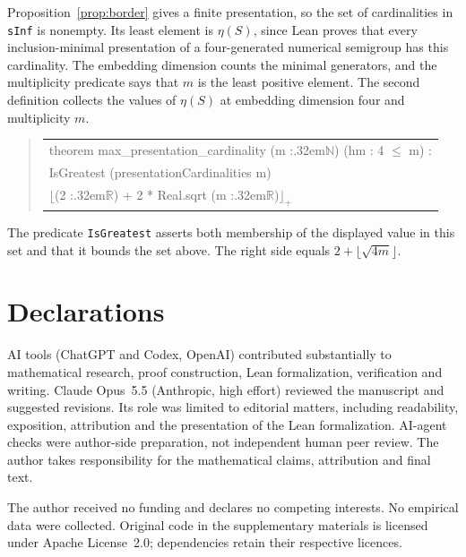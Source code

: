 \documentclass[11pt]{article}
\theoremstyle{definition}
\theoremstyle{remark}
\theoremstyle{plain}
\begin{document}
Proposition~\ref{prop:border} gives a finite presentation, so the set
of cardinalities in \texttt{sInf} is nonempty. Its least element is
$\eta(S)$, since Lean proves that every inclusion-minimal presentation
of a four-generated numerical semigroup has this cardinality.
The embedding dimension counts the minimal generators, and the
multiplicity predicate says that $m$ is the least positive element.
The second definition collects the values of $\eta(S)$ at embedding
dimension four and multiplicity $m$.

\begin{quote}\small\ttfamily
\begin{tabular}{@{}l@{}}
\hspace*{0em}theorem max\_presentation\_cardinality (m :\kern.32em\(\mathbb N\)) (hm : 4 \(\le\) m) :\\
\hspace*{2em}IsGreatest (presentationCardinalities m)\\
\hspace*{3em}\(\lfloor\)(2 :\kern.32em\(\mathbb R\)) + 2 * Real.sqrt (m :\kern.32em\(\mathbb R\))\(\rfloor_+\)
\end{tabular}
\end{quote}

The predicate \texttt{IsGreatest} asserts both membership of the displayed
value in this set and that it bounds the set above. The right side equals
$2+\lfloor\sqrt{4m}\rfloor$.

\section*{Declarations}
AI tools (ChatGPT and Codex, OpenAI) contributed substantially to
mathematical research, proof construction, Lean formalization,
verification and writing. Claude Opus~5.5 (Anthropic, high effort) reviewed the manuscript and
suggested revisions. Its role was limited to editorial matters, including
readability, exposition, attribution and the presentation of the Lean
formalization.
AI-agent checks were author-side preparation,
not independent human peer review. The author takes responsibility for the mathematical claims, attribution
and final text.

The author received no funding and declares no competing interests.
No empirical data were collected. Original code in the supplementary
materials is licensed under Apache License~2.0; dependencies retain
their respective licences.
\end{document}
